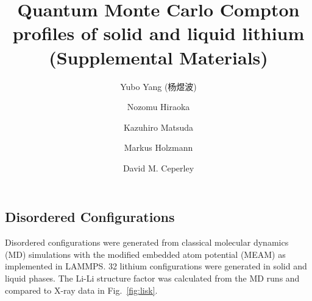 \documentclass[aps,prl,superscriptaddress]{revtex4-1}
\begin{document}
\begin{CJK*}{UTF8}{zhsong}
\title{Quantum Monte Carlo Compton profiles of solid and liquid lithium (Supplemental Materials)}
\author{Yubo Yang (杨煜波)}
\author{Nozomu Hiraoka}
\author{Kazuhiro Matsuda}
\author{Markus Holzmann}
\author{David M. Ceperley}
\maketitle
\end{CJK*}

\subsection{Disordered Configurations}

Disordered configurations were generated from classical molecular dynamics (MD) simulations with the modified embedded atom potential (MEAM) as implemented in LAMMPS. 32 lithium configurations were generated in solid and liquid phases. The Li-Li structure factor was calculated from the MD runs and compared to X-ray data in Fig.~\ref{fig:lisk}.
\end{document}
